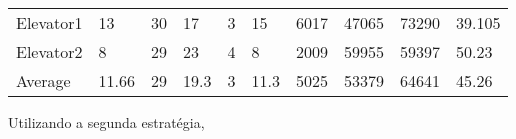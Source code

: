 \documentclass[a4paper]{article}
\begin{document}
\begin{table}[h]
\begin{tabular}{@{}llllllllll@{}}
Elevator1 & 13        & 30            &  17           & 3                                                               & 15                                                                  & 6017                                                         & 47065                                                 & 73290                                                   & 39.105         \\
Elevator2 & 8        & 29            & 23           & 4                                                               & 8                                                                  & 2009                                                         & 59955                                                 & 59397                                                   & 50.23         \\
Average   & 11.66     & 29         & 19.3        & 3                                                              & 11.3                                                            & 5025                                                         & 53379                                                 & 64641                                                   & 45.26         \\ \bottomrule
\end{tabular}
\end{table}

\newpage

Utilizando a segunda estratégia,
\end{document}
